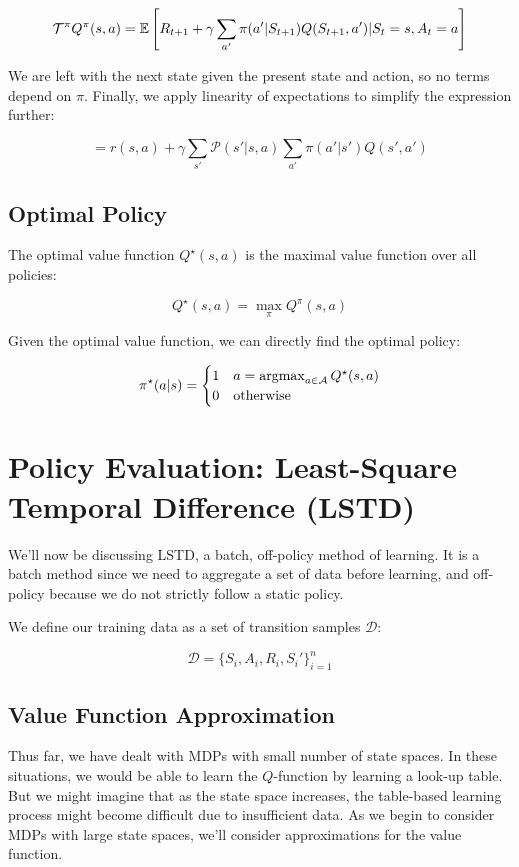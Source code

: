 \documentclass[11pt]{article}
\begin{document}
$$\mathcal{T}^\pi Q^\pi(s,a)= \mathbb{E}\left[ R_{t+1} + \gamma \sum_{a'} \pi(a' | S_{t+1}) Q(S_{t+1}, a') | S_t = s, A_t = a \right]$$

We are left with the next state given the present state and action, so no terms depend on $\pi$. Finally, we apply linearity of expectations to simplify the expression further:

$$=r(s,a) + \gamma \sum_{s'} \mathcal{P}(s' | s, a)\sum_{a'} \pi(a'|s')Q(s', a')$$

\subsection{Optimal Policy}

The optimal value function $Q^\star(s, a)$ is the maximal value function over all policies:

$$Q^\star(s, a) = \max_{\pi} Q^\pi(s, a)$$

Given the optimal value function, we can directly find the optimal policy:

$$\pi^\star(a | s) = \begin{cases}
  1 & a = \operatorname*{argmax}_{a \in \mathcal{A}} Q^\star(s, a)\\
  0 & \text{otherwise}
\end{cases}$$

\section{Policy Evaluation: Least-Square Temporal Difference (LSTD)}

We'll now be discussing LSTD, a batch, off-policy method of learning. It is a batch method since we need to aggregate a set of data before learning, and off-policy because we do not strictly follow a static policy.

We define our training data as a set of transition samples $\mathcal{D}$:

$$\mathcal{D} = \{S_i, A_i, R_i, S_i'\}_{i=1}^n$$

\subsection{Value Function Approximation}

Thus far, we have dealt with MDPs with small number of state spaces. In these situations, we would be able to learn the $Q$-function by learning a look-up table. But we might imagine that as the state space increases, the table-based learning process might become difficult due to insufficient data. As we begin to consider MDPs with large state spaces, we'll consider approximations for the value function.
\end{document}
